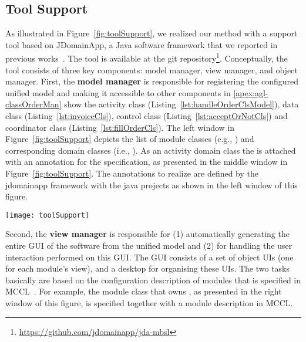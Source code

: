 \subsection{Tool Support}
\label{subsect:toolSupport} %


As illustrated in Figure~\ref{fig:toolSupport}, we realized our method with a support tool based on JDomainApp, a Java software framework that we reported in previous works~\cite{le_domain_2018}. The tool is available at the git repository\footnote{\url{https://github.com/jdomainapp/jda-mbsl}}. %
%
Conceptually, the tool consists of three key components: model manager, view manager, and object manager. First, the \textbf{model manager} is responsible for registering the configured unified model and making it accessible to other components 
%
in \ref{apex:agl-classOrderMan} show the activity class  (Listing~\ref{lst:handleOrderClsModel}), data class  (Listing~\ref{lst:invoiceCls}), control class  (Listing~\ref{lst:acceptOrNotCls}) and coordinator class  (Listing~\ref{lst:fillOrderCls}).
%
The left window in Figure~\ref{fig:toolSupport} depicts the list of module classes (e.g., ) and corresponding domain classes (i.e., ). As an activity domain class the  is attached with an annotation  for the \agl specification, as presented in the middle window in Figure~\ref{fig:toolSupport}. The annotations to realize \agl are defined by the jdomainapp framework with the java projects as shown in the left window of this figure. 

\begin{figure*}[ht]
	\centering
	\texttt{[image: toolSupport]}
	\caption{Illustration for the JDomainApp-based realization and usability of \agl.} %
	\label{fig:toolSupport}
\end{figure*}

Second, the \textbf{view manager} is responsible for (1) automatically generating the entire GUI of the software from the unified model and (2) for handling the user interaction performed on this GUI. The GUI consists of a set of object UIs (one for each module's view), and a desktop for organising these UIs. The two tasks basically are based on the configuration description of modules that is specified in MCCL~\cite{le_domain_2018}. For example, the module class  that owns , as presented in the right window of this figure, is specified together with a module description in MCCL.


